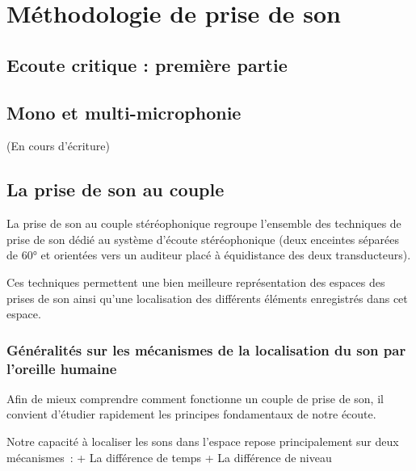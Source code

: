 \documentclass[
  letterpaper,
  DIV=11,
  numbers=noendperiod]{scrreprt}
\begin{document}
\part{Méthodologie de prise de son}

\hypertarget{ecoute-critique-premiuxe8re-partie}{%
\chapter{Ecoute critique : première
partie}\label{ecoute-critique-premiuxe8re-partie}}

\hypertarget{mono-et-multi-microphonie}{%
\chapter{Mono et multi-microphonie}\label{mono-et-multi-microphonie}}

(En cours d'écriture)

\hypertarget{la-prise-de-son-au-couple}{%
\chapter{La prise de son au couple}\label{la-prise-de-son-au-couple}}

La prise de son au couple stéréophonique regroupe l'ensemble des
techniques de prise de son dédié au système d'écoute stéréophonique
(deux enceintes séparées de 60° et orientées vers un auditeur placé à
équidistance des deux transducteurs).

Ces techniques permettent une bien meilleure représentation des espaces
des prises de son ainsi qu'une localisation des différents éléments
enregistrés dans cet espace.

\hypertarget{guxe9nuxe9ralituxe9s-sur-les-muxe9canismes-de-la-localisation-du-son-par-loreille-humaine}{%
\section{Généralités sur les mécanismes de la localisation du son par
l'oreille
humaine}\label{guxe9nuxe9ralituxe9s-sur-les-muxe9canismes-de-la-localisation-du-son-par-loreille-humaine}}

Afin de mieux comprendre comment fonctionne un couple de prise de son,
il convient d'étudier rapidement les principes fondamentaux de notre
écoute.

Notre capacité à localiser les sons dans l'espace repose principalement
sur deux mécanismes~: + La différence de temps + La différence de niveau
\end{document}
